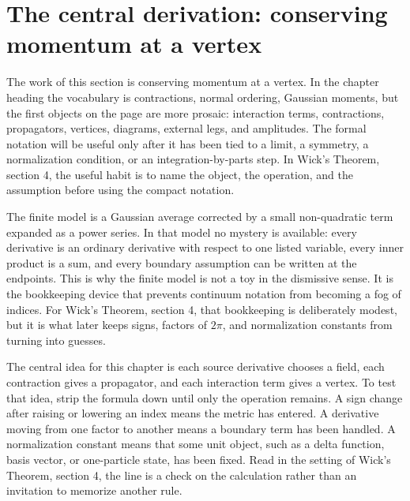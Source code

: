 \section{The central derivation: conserving momentum at a vertex}













The work of this section is conserving momentum at a vertex.  In the chapter heading the vocabulary is contractions, normal ordering, Gaussian moments, but the first objects on the page are more prosaic: interaction terms, contractions, propagators, vertices, diagrams, external legs, and amplitudes.  The formal notation will be useful only after it has been tied to a limit, a symmetry, a normalization condition, or an integration-by-parts step.  In Wick's Theorem, section 4, the useful habit is to name the object, the operation, and the assumption before using the compact notation.

The finite model is a Gaussian average corrected by a small non-quadratic term expanded as a power series.  In that model no mystery is available: every derivative is an ordinary derivative with respect to one listed variable, every inner product is a sum, and every boundary assumption can be written at the endpoints.  This is why the finite model is not a toy in the dismissive sense.  It is the bookkeeping device that prevents continuum notation from becoming a fog of indices.  For Wick's Theorem, section 4, that bookkeeping is deliberately modest, but it is what later keeps signs, factors of \(2\pi\), and normalization constants from turning into guesses.

The central idea for this chapter is each source derivative chooses a field, each contraction gives a propagator, and each interaction term gives a vertex.  To test that idea, strip the formula down until only the operation remains.  A sign change after raising or lowering an index means the metric has entered.  A derivative moving from one factor to another means a boundary term has been handled.  A normalization constant means that some unit object, such as a delta function, basis vector, or one-particle state, has been fixed.  Read in the setting of Wick's Theorem, section 4, the line is a check on the calculation rather than an invitation to memorize another rule.

